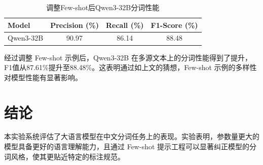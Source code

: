 \documentclass[11pt]{article}
\begin{document}
\begin{table}[H]
    \centering
    \caption{调整Few-shot后Qwen3-32B分词性能}
    \label{tab:cresult}
    \begin{tabular}{l c c c}
        \toprule
        \textbf{Model} & \textbf{Precision (\%)} & \textbf{Recall (\%)} & \textbf{F1-Score (\%)} \\
        \midrule

        Qwen3-32B     & 90.97 & 86.14 & 88.48 \\
        
        \bottomrule
    \end{tabular}
\end{table}
经过调整 Few-shot 示例后，Qwen3-32B 在多源文本上的分词性能得到了提升，F1值从87.61\%提升至88.48\%。这表明通过如上文的猜想，Few-shot 示例的多样性对模型性能有显著影响。
\section{结论}
本实验系统评估了大语言模型在中文分词任务上的表现。实验表明，参数量更大的模型具备更好的语言理解能力，且通过 Few-shot 提示工程可以显著纠正模型的分词风格，使其更贴近特定的标注规范。
\end{document}
